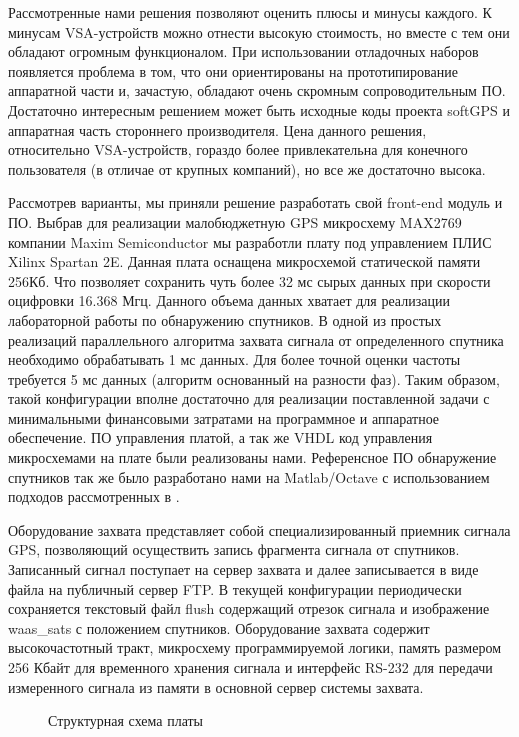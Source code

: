 \documentclass[a4paper,12pt]{article}
\numberwithin{table}{section}
\begin{document}
Рассмотренные нами решения позволяют оценить плюсы и минусы каждого.
К минусам VSA-устройств можно отнести высокую стоимость, но вместе с тем они обладают огромным функционалом.
При использовании отладочных наборов появляется проблема в том, что они ориентированы на прототипирование аппаратной
части и, зачастую, обладают очень скромным сопроводительным ПО.
Достаточно интересным решением может быть исходные коды проекта softGPS и аппаратная часть стороннего производителя.
Цена данного решения, относительно VSA-устройств, гораздо более привлекательна для конечного пользователя
(в отличае от крупных компаний), но все же достаточно высока.

Рассмотрев варианты, мы приняли решение разработать свой front-end модуль и ПО.
Выбрав для реализации малобюджетную GPS микросхему MAX2769 компании Maxim Semiconductor мы разработли плату под управлением ПЛИС Xilinx Spartan 2E.
Данная плата оснащена микросхемой статической памяти 256Кб.
Что позволяет сохранить чуть более 32 мс сырых данных при скорости оцифровки 16.368 Мгц.
Данного объема данных хватает для реализации лабораторной работы по обнаружению спутников.
В одной из простых реализаций параллельного алгоритма захвата сигнала от определенного спутника необходимо обрабатывать 1 мс данных.
Для более точной оценки частоты требуется 5 мс данных (алгоритм основанный на разности фаз).
Таким образом, такой конфигурации вполне достаточно для реализации поставленной задачи с минимальными
финансовыми затратами на программное и аппаратное обеспечение.
ПО управления платой, а так же VHDL код управления микросхемами на плате были реализованы нами.
Референсное ПО обнаружение спутников так же было разработано нами на Matlab/Octave с использованием подходов рассмотренных в \cite{tsui}.

Оборудование захвата представляет собой специализированный приемник сигнала GPS, позволяющий осуществить запись фрагмента сигнала от спутников.
Записанный сигнал поступает на сервер захвата и далее записывается в виде файла на публичный сервер FTP.
В текущей конфигурации \cite{gpsproject} периодически сохраняется текстовый файл flush содержащий отрезок сигнала и изображение waas\_sats с
положением спутников. Оборудование захвата содержит высокочастотный тракт, микросхему программируемой логики, память размером 256 Кбайт
для временного хранения сигнала и интерфейс RS-232 для передачи измеренного сигнала из памяти в основной сервер системы захвата.

\begin{figure}[h]
\begin{center}
\end{center}
\caption{Структурная схема платы}
\label{pic:bpsk}
\end{figure}
\end{document}

